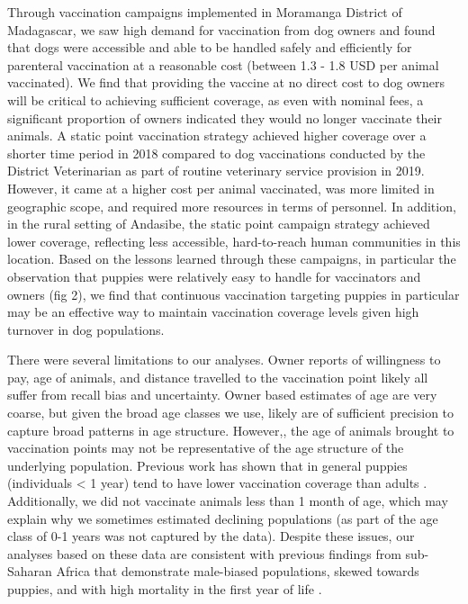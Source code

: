 \documentclass[tropicalmed,article,submit,moreauthors,pdftex]{mdpi}
\begin{document}
Through vaccination campaigns implemented in Moramanga District of
Madagascar, we saw high demand for vaccination from dog owners and found
that dogs were accessible and able to be handled safely and efficiently
for parenteral vaccination at a reasonable cost (between 1.3 - 1.8 USD
per animal vaccinated). We find that providing the vaccine at no direct
cost to dog owners will be critical to achieving sufficient coverage, as
even with nominal fees, a significant proportion of owners indicated
they would no longer vaccinate their animals. A static point vaccination
strategy achieved higher coverage over a shorter time period in 2018
compared to dog vaccinations conducted by the District Veterinarian as
part of routine veterinary service provision in 2019. However, it came
at a higher cost per animal vaccinated, was more limited in geographic
scope, and required more resources in terms of personnel. In addition,
in the rural setting of Andasibe, the static point campaign strategy
achieved lower coverage, reflecting less accessible, hard-to-reach human
communities in this location. Based on the lessons learned through these
campaigns, in particular the observation that puppies were relatively
easy to handle for vaccinators and owners (fig 2), we find that
continuous vaccination targeting puppies in particular may be an
effective way to maintain vaccination coverage levels given high
turnover in dog populations.

There were several limitations to our analyses. Owner reports of
willingness to pay, age of animals, and distance travelled to the
vaccination point likely all suffer from recall bias and uncertainty.
Owner based estimates of age are very coarse, but given the broad age
classes we use, likely are of sufficient precision to capture broad
patterns in age structure. However,, the age of animals brought to
vaccination points may not be representative of the age structure of the
underlying population. Previous work has shown that in general puppies
(individuals \textless{} 1 year) tend to have lower vaccination coverage
than adults
\citep{arief2016, sanchez-soriano2020, mazeri2019, minyoo2015}.
Additionally, we did not vaccinate animals less than 1 month of age,
which may explain why we sometimes estimated declining populations (as
part of the age class of 0-1 years was not captured by the data).
Despite these issues, our analyses based on these data are consistent
with previous findings from sub-Saharan Africa that demonstrate
male-biased populations, skewed towards puppies, and with high mortality
in the first year of life \citep{czupryna2016, taylor2017}.
\end{document}
